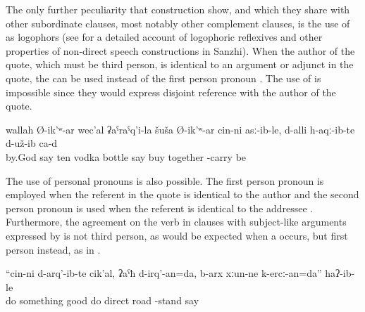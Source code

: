 The only further peculiarity that  construction show, and which they share with other subordinate clauses, most notably other complement clauses, is the use of  as logophors (see \citealp{ForkerSubmittedb} for a detailed account of logophoric reflexives and other properties of non-direct speech constructions in Sanzhi). When the author of the quote, which must be third person, is identical to an argument or adjunct in the quote, the  can be used instead of the first person pronoun . The use of  is impossible since they would express disjoint reference with the author of the quote.
%
\begin{exe}
	\ex	\label{ex:‎‎‎By God, he said that he himself had bought 10 bottles of vodka; and apparently he had brought them with him}
	\gll	wallah		Ø-ik'ʷ-ar	wec'al	ʡaˁraˁq'i-la	šuša	Ø-ik'ʷ-ar	cin-ni	asː-ib-le,	d-alli	h-aqː-ib-te	d-už-ib	ca-d	\\
		by.God say	ten	vodka	bottle	say		buy	together	-carry 	be	\\
	\glt	{}
\end{exe}

The use of personal pronouns is also possible. The first person pronoun is employed when the referent in the quote is identical to the author  and the second person pronoun is used when the referent is identical to the addressee . Furthermore, the agreement on the verb in clauses with subject-like arguments expressed by  is not third person, as would be expected when a  occurs, but first person instead, as in .
%
\begin{exe}
	\ex	\label{ex:‎(He said,) The things that I have done, I will repair (make better), I will be on the right road}
	\gll	``cin-ni	d-arq'-ib-te	cik'al,	ʡaˁħ	d-irq'-an=da,	b-arx	xːun-ne	k-ercː-an=da''	haʔ-ib-le\\
			do something	good	do	direct	road	-stand	say\\
	\glt	{}
\end{exe}

